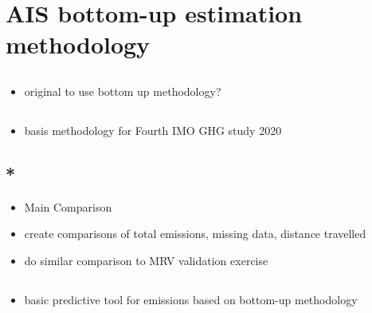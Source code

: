 \documentclass{article}
\newcommand{\paperpath}{../resources/}
\newcommand{\myhref}[2]{\href{run:\paperpath#1}{#2}}
\begin{document}
\section{AIS bottom-up estimation methodology}
\subsection{\myhref{Uge 2020 - Estimation_of_worldwide_ship_emissions_using_AIS_signals.pdf}{\textcite{uge2020estimation}}}
\subsection{\myhref{Jalkanen et al 2009 - A modelling system for the exhaust emissions of marine traffic and its application in the Baltic Sea area.pdf}{\textcite{jalkanen2009modelling}}}
\begin{itemize}
    \item original to use bottom up methodology?
\end{itemize}
\subsection{\myhref{Olmer et al 2017 - Global-shipping-GHG-emissions-2013-2015_Methodology_17102017_vF.pdf}{\textcite{olmer2017greenhouse}}}
\begin{itemize}
    \item basis methodology for Fourth IMO GHG study 2020
\end{itemize}
\subsection{*\myhref{Fourth IMO GHG Study 2020 - Full report and annexes.pdf}{\textcite{faber2020fourth}}}
\begin{itemize}
    \item Main Comparison
    \item create comparisons of total emissions, missing data, distance travelled
    \item do similar comparison to MRV validation exercise
\end{itemize}
\subsection{\myhref{Ventikos et al 2021 - Development of a tool for calculating ship air emissions.pdf}{\textcite{ventikosdevelopment}}}
\begin{itemize}
    \item basic predictive tool for emissions based on bottom-up methodology
\end{itemize}
\end{document}
